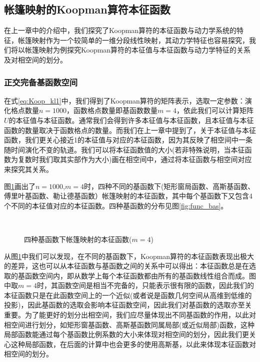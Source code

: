 \subsection{帐篷映射的Koopman算符本征函数}
在上一章中的介绍中，我们探究了Koopman算符的本征函数与动力学系统的特征，帐篷映射作为一个较简单的一维分段线性映射，其动力学特征也容易探究，我们将以帐篷映射为例探究Koopman算符的本征值与本征函数与动力学特征的关系及对相空间的划分。


\subsubsection{正交完备基函数空间}
在式\eqref{eq:Koop_kl1}中，我们得到了Koopman算符的矩阵表示，选取一定参数：演化格点数量$n=1000$，函数格点数量即基函数数量$m=4$，依此我们可以计算矩阵$U$的本征值与本征函数。通常我们会得到许多本征值与本征函数，且本征值与本征函数的数量取决于函数格点的数量。而我们在上一章中提到了，关于本征值与本征函数，我们更关心接近1的本征值与对应的本征函数，因为其反映了相空间中一条随时间演化不变的轨道。我们可以将本征函数值的大小(若非特殊说明，当本征函数为复数时我们取其实部作为大小)画在相空间中，通过将本征函数与相空间对应来探究其关系。

图\ref{fig:tent_eig_RGFL}画出了$n=1000$,$m=4$时，四种不同的基函数下(矩形窗局函数、高斯基函数、傅里叶基函数、勒让德基函数）帐篷映射的本征函数，其中每个基函数下又包含4个不同的本征值对应的本征函数。四种基函数的分布见图\ref{fig:func_bas}。
\begin{figure}[!]
    \centering
      \\
    \caption{四种基函数下帐篷映射的本征函数($m=4$)}\label{fig:tent_eig_RGFL}
\end{figure}
从图\ref{fig:tent_eig_RGFL}中我们可以发现，在不同的基函数下，Koopman算符的本征函数表现出极大的差异，这也可以从本征函数与基函数之间的关系中可以得出：本征函数总是在选取的基函数空间内，即从数学上每个本征函数都由所有的基函数线性组合而成。图中取$m=4$时，其函数空间是相当不完备的，只能表示很有限的函数，因此我们的本征函数只是在此函数空间上的一个近似(或者说是函数几何空间从高维到低维的投影)，因此基函数的选取会影响本征函数空间，因此我们对基函数的选取亦至关重要。为了能更好的划分出相空间，我们应尽量体现出不同基函数的作用，以此对相空间进行划分，如矩形窗基函数、高斯基函数同属局部(或近似局部)函数，这种局部函数能通过每个基函数比例系数的大小来体现对相空间的划分，因此我们更关心这种局部函数，在后面的计算中也会更多的使用高斯基，以此来体现本征函数对相空间的划分。

